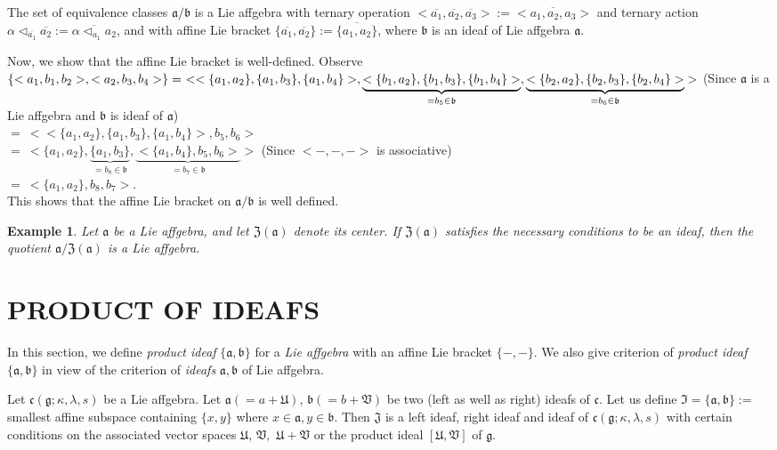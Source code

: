 \documentclass{article}
\newtheorem{example}[theorem]{Example}
\theoremstyle{definition}
\theoremstyle{remark}
\theoremstyle{plain}
\begin{document}
The set of equivalence classes $\mathfrak{a}/\mathfrak{b}$ is a Lie affgebra with ternary operation $<\overline{a_1}, \overline{a_2},\overline{a_3} >:=\overline{<a_1, a_2, a_3>} $ and ternary action $\alpha\triangleleft_{\overline{a_1}}\overline{a_2}:=\overline{\alpha\triangleleft_{a_1}a_2}$, and with affine Lie bracket $\{\overline{a_1}, \overline{a_2}\}:=\overline{\{a_1, a_2\}}$, where $\mathfrak{b}$ is an ideaf of Lie affgebra $\mathfrak{a}.$

Now, we show that the affine Lie bracket is well-defined. Observe\\
 $ \{<a_1, b_1, b_2>, <a_2, b_3, b_4>\}\\
=~<<\{a_1, a_2\},\{a_1, b_3\},\{a_1, b_4\}>, \underbrace{<\{b_1, a_2\}, \{b_1, b_3\}, \{b_1, b_4\}>}_{=b_5\in \mathfrak{b}},\underbrace{<\{b_2, a_2\}, \{b_2, b_3\}, \{b_2, b_4\}>}_{=b_6\in \mathfrak{b}}>$ (Since $\mathfrak{a}$ is a Lie affgebra and $\mathfrak{b}$ is ideaf of $\mathfrak{a}$)\\
$=~<<\{a_1, a_2\},\{a_1, b_3\},\{a_1, b_4\}>, b_5, b_6>$\\
$=~<\{a_1, a_2\},\underbrace{\{a_1, b_3\}}_{=b_8\in \mathfrak{b}},\underbrace{<\{a_1, b_4\}, b_5, b_6>}_{=b_7\in \mathfrak{b}}>$
(Since $<-,-,->$ is associative)\\
$=~<\{a_1, a_2\}, b_8, b_7>$.\\
This shows that the affine Lie bracket on $\mathfrak{a}/\mathfrak{b}$ is well defined.

\begin{example}
    Let $\mathfrak{a}$ be a Lie affgebra, and let $\mathfrak{Z}(\mathfrak{a})$ denote its center. If $\mathfrak{Z}(\mathfrak{a})$ satisfies the necessary conditions to be an ideaf, then the quotient $\mathfrak{a}/\mathfrak{Z}(\mathfrak{a})$ is a Lie affgebra.
\end{example}


\section{PRODUCT OF IDEAFS}

In this section, we define \emph{product ideaf} $\{\mathfrak{a}, \mathfrak{b}\}$ for a \emph{Lie affgebra} with an affine Lie bracket $\{-, -\}.$ We also give criterion of \emph{product ideaf} $\{\mathfrak{a}, \mathfrak{b}\}$ in view of the criterion of \emph{ideafs} $\mathfrak{a}, \mathfrak{b}$ of Lie affgebra.


Let $\mathfrak{c}(\mathfrak{g}; \kappa, \lambda, s)$ be a Lie affgebra. Let $\mathfrak{a}( =a + \mathfrak{U})$, $\mathfrak{b}( =b + \mathfrak{V})$ be two (left as well as right) ideafs of $\mathfrak{c}$. Let us define $\mathfrak{I}=\{\mathfrak{a}, \mathfrak{b}\}:=$ smallest affine subspace containing $\{x, y\}$ where $x\in \mathfrak{a}, y \in \mathfrak{b}$. Then $\mathfrak{J}$ is a left ideaf, right ideaf and ideaf of $\mathfrak{c}(\mathfrak{g}; \kappa, \lambda, s)$ with certain conditions on the associated vector spaces $\mathfrak{U}$, $\mathfrak{V},$ $\mathfrak{U}+\mathfrak{V}$ or the product ideal $[\mathfrak{U}, \mathfrak{V}]$ of $\mathfrak{g}$.
\end{document}
